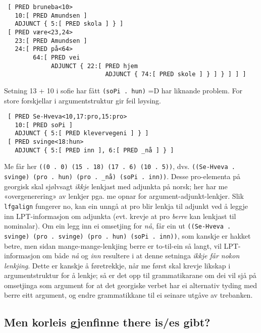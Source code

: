 \documentclass[11pt,a4paper,oneside,draft]{book}
\begin{document}
\begin{verbatim}
 [ PRED bruneba<10>
   10:[ PRED Amundsen ]
   ADJUNCT { 5:[ PRED skola ] } ]
 [ PRED være<23,24>
   23:[ PRED Amundsen ]
   24:[ PRED på<64>
        64:[ PRED vei
             ADJUNCT { 22:[ PRED hjem
                            ADJUNCT { 74:[ PRED skole ] } ] } ] ] ]
\end{verbatim}



Setning 13 + 10 i sofie har fått \texttt{(soPi . hun)} =D har liknande
problem. For store forskjellar i argumentstruktur gir feil løysing.

\begin{verbatim}
 [ PRED Se-Hveva<10,17:pro,15:pro>
   10:[ PRED soPi ]
   ADJUNCT { 5:[ PRED klevervegeni ] } ]
 [ PRED svinge<18:hun>
   ADJUNCT { 5:[ PRED inn ], 6:[ PRED _nå ] } ]
\end{verbatim}


Me får her \texttt{((0 . 0) (15 . 18) (17 . 6) (10 . 5))}, dvs. \texttt{((Se-Hveva . svinge) (pro . hun) (pro . \_nå) (soPi . inn))}. Desse pro-elementa
på georgisk skal sjølvsagt \emph{ikkje} lenkjast med adjunkta på norsk; her
har me «overgenerering» av lenkjer pga. me opnar for
argument-adjunkt-lenkjer. Slik \texttt{lfgalign} fungerer no, kan ein unngå
at pro blir lenkja til adjunkt ved å leggje inn LPT-informasjon om
adjunkta (evt. krevje at pro \emph{berre} kan lenkjast til nominalar). Om
ein legg inn ei omsetjing for \emph{nå}, får ein ut \texttt{((Se-Hveva . svinge) (pro . svinge) (pro . hun) (soPi . inn))}, som kanskje er hakket
betre, men sidan mange-mange-lenkjing berre er to-til-ein så langt,
vil LPT-informasjon om både \emph{nå} og \emph{inn} resultere i at denne
setninga \emph{ikkje får nokon lenkjing}. Dette er kanskje å føretrekkje,
når me først skal krevje likskap i argumentstruktur for å lenkje; så
er det opp til grammatikarane om dei vil sjå på omsetjinga som
argument for at det georgiske verbet har ei alternativ tyding med
berre eitt argument, og endre grammatikkane til ei seinare utgåve av
trebanken.


  

\subsection{Men korleis gjenfinne there is/es gibt?}
\label{sec-5.2.1}
\end{document}

